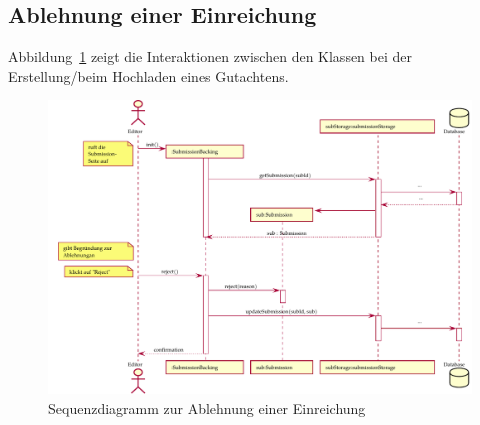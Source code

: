 \subsection{Ablehnung einer Einreichung}\label{subsec:sequenz-ablehnung}

Abbildung~\ref{fig:upload-review-sequence} zeigt die Interaktionen zwischen den Klassen bei der Erstellung/beim Hochladen eines Gutachtens.

\begin{figure}
    \centering
    \includegraphics[width=\textwidth]{graphics/reject_submission}
    \caption{Sequenzdiagramm zur Ablehnung einer Einreichung}
    \label{fig:upload-review-sequence}
\end{figure}
